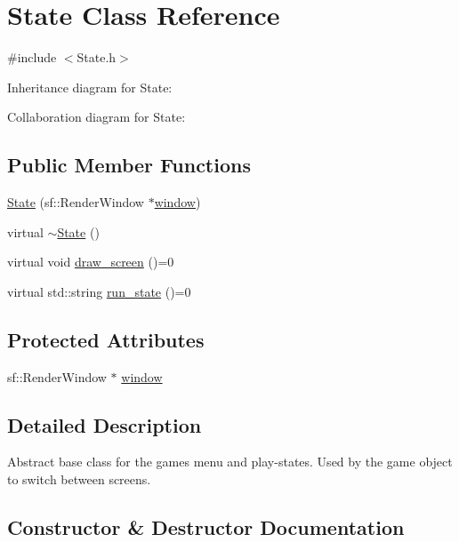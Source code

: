 \hypertarget{classState}{}\section{State Class Reference}
\label{classState}


{\ttfamily \#include $<$State.\+h$>$}



Inheritance diagram for State\+:


Collaboration diagram for State\+:
\subsection*{Public Member Functions}
\begin{DoxyCompactItemize}
\item 
\hyperlink{classState_a02d5f0207c19c47f231ed10e12764e2e}{State} (sf\+::\+Render\+Window $\ast$\hyperlink{classState_ae6259a383c98ae7496266a76a9daf478}{window})
\item 
virtual \hyperlink{classState_afab438d92b90dc18d194dbd9c9c8bab3}{$\sim$\+State} ()
\item 
virtual void \hyperlink{classState_a048a3b3ebeaf1c8a553040d42a61c48c}{draw\+\_\+screen} ()=0
\item 
virtual std\+::string \hyperlink{classState_a84fb17cf9f6a59c78e600b619670a0d9}{run\+\_\+state} ()=0
\end{DoxyCompactItemize}
\subsection*{Protected Attributes}
\begin{DoxyCompactItemize}
\item 
sf\+::\+Render\+Window $\ast$ \hyperlink{classState_ae6259a383c98ae7496266a76a9daf478}{window}
\end{DoxyCompactItemize}


\subsection{Detailed Description}
Abstract base class for the games menu and play-\/states. Used by the game object to switch between screens. 

\subsection{Constructor \& Destructor Documentation}
\mbox{\label{classState_a02d5f0207c19c47f231ed10e12764e2e}} 
